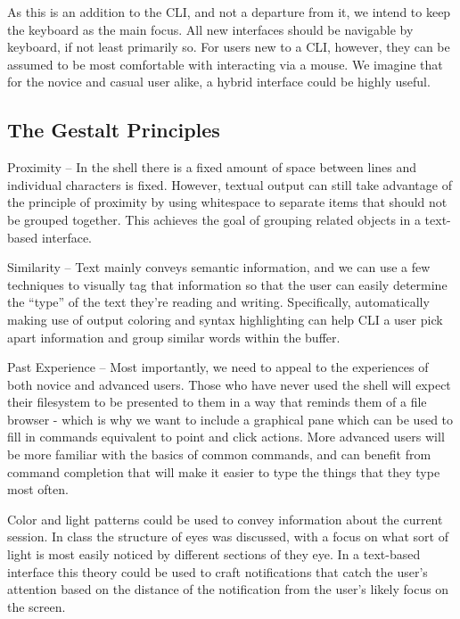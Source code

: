 As this is an addition to the CLI, and not a departure from it, we intend to
keep the keyboard as the main focus. All new interfaces should be navigable by
keyboard, if not least primarily so. For users new to a CLI, however, they can
be assumed to be most comfortable with interacting via a mouse. We imagine that
for the novice and casual user alike, a hybrid interface could be highly useful.

\subsection*{The Gestalt Principles}

Proximity \--- In the shell there is a fixed amount of space between lines and
individual characters is fixed. However, textual output can still take advantage
of the principle of proximity by using whitespace to separate items that should
not be grouped together. This achieves the goal of grouping related objects in a
text-based interface.

Similarity \--- Text mainly conveys semantic information, and we can use a few
techniques to visually tag that information so that the user can easily
determine the “type” of the text they’re reading and writing. Specifically,
automatically making use of output coloring and syntax highlighting can help CLI
a user pick apart information and group similar words within the buffer.

Past Experience \--- Most importantly, we need to appeal to the experiences of both
novice and advanced users. Those who have never used the shell will expect their
filesystem to be presented to them in a way that reminds them of a file browser
- which is why we want to include a graphical pane which can be used to fill in
commands equivalent to point and click actions. More advanced users will be more
familiar with the basics of common commands, and can benefit from command
completion that will make it easier to type the things that they type most
often.

Color and light patterns could be used to convey information about the current
session. In class the structure of eyes was discussed, with a focus on what sort
of light is most easily noticed by different sections of they eye. In a
text-based interface this theory could be used to craft notifications that catch
the user’s attention based on the distance of the notification from the user’s
likely focus on the screen.

